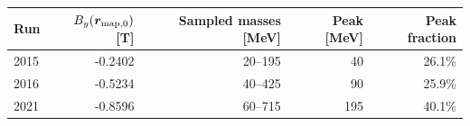 \begin{tabular}{lrrrr}\toprule
Run & $B_y(\boldsymbol r_{\rm map,0})$ [T] & Sampled masses [MeV] & Peak [MeV] & Peak fraction\\\midrule
2015 & -0.2402 & 20--195 & 40 & 26.1\%\\
2016 & -0.5234 & 40--425 & 90 & 25.9\%\\
2021 & -0.8596 & 60--715 & 195 & 40.1\%\\
\bottomrule\end{tabular}
